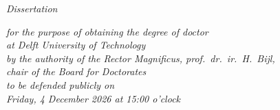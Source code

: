 \begin{titlepage}

    \begin{center}

        \vspace*{2\bigskipamount}

        {\makeatletter
            \bfseries\LARGE\@title
            \makeatother}

        {\makeatletter
            \ifx\@subtitle\undefined\else
                \bigskip
                \titlefont\titleshape\Large\@subtitle
            \fi
            \makeatother}

    \end{center}

    \cleardoublepage
    \thispagestyle{empty}

    \begin{center}


        \vspace*{2\bigskipamount}

        {\makeatletter
            \bfseries\LARGE\@title
            \makeatother}

        {\makeatletter
            \ifx\@subtitle\undefined\else
                \bigskip
                \titlefont\titleshape\Large\@subtitle
            \fi
            \makeatother}

        \vfill


        {\Large\textit{Dissertation}}

        \bigskip
        \bigskip

        \textit{for the purpose of obtaining the degree of doctor \\
        at Delft University of Technology \\
        by the authority of the Rector Magnificus, prof.~dr.~ir.~H.~Bijl, \\
        chair of the Board for Doctorates \\
        to be defended publicly on \\
        Friday, 4 December 2026 at 15:00 o'clock}


\end{center}
\end{titlepage}

